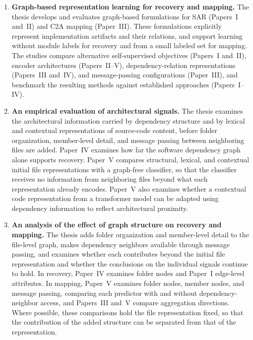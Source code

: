 \begin{enumerate}[leftmargin=1em]

    \item \textbf{Graph-based representation learning for recovery and mapping.} The thesis develops and evaluates graph-based formulations for SAR (Papers~I and~II) and C2A mapping (Paper~III). These formulations explicitly represent implementation artifacts and their relations, and support learning without module labels for recovery and from a small labeled set for mapping. The studies compare alternative self-supervised objectives (Papers~I and~II), encoder architectures (Papers~II--V), dependency-relation representations (Papers~III and~IV), and message-passing configurations (Paper~III), and benchmark the resulting methods against established approaches (Papers~I--IV).

    \item \textbf{An empirical evaluation of architectural signals.} The thesis examines the architectural information carried by dependency structure and by lexical and contextual representations of source-code content, before folder organization, member-level detail, and message passing between neighboring files are added. Paper~IV examines how far the software dependency graph alone supports recovery. Paper~V compares structural, lexical, and contextual initial file representations with a graph-free classifier, so that the classifier receives no information from neighboring files beyond what each representation already encodes. Paper~V also examines whether a contextual code representation from a transformer model can be adapted using dependency information to reflect architectural proximity.
    
    \item \textbf{An analysis of the effect of graph structure on recovery and mapping.} The thesis adds folder organization and member-level detail to the file-level graph, makes dependency neighbors available through message passing, and examines whether each contributes beyond the initial file representation and whether the conclusions on the individual signals continue to hold. In recovery, Paper~IV examines folder nodes and Paper~I edge-level attributes. In mapping, Paper~V examines folder nodes, member nodes, and message passing, comparing each predictor with and without dependency-neighbor access, and Papers~III and~V compare aggregation directions. Where possible, these comparisons hold the file representation fixed, so that the contribution of the added structure can be separated from that of the representation.


\end{enumerate}
